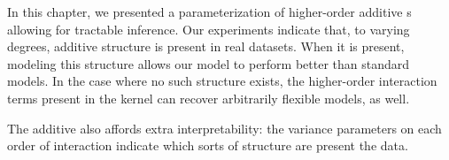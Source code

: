 In this chapter, we presented a parameterization of higher-order additive \gp{}s allowing for tractable inference.
Our experiments indicate that, to varying degrees, additive structure is present in real datasets.
When it is present, modeling this structure allows our model to perform better than standard \gp{} models.
In the case where no such structure exists, the higher-order interaction terms present in the kernel can recover arbitrarily flexible models, as well.

The additive \gp{} also affords extra interpretability: the variance parameters on each order of interaction indicate which sorts of structure are present the data.




\outbpdocument{


}







%
%


